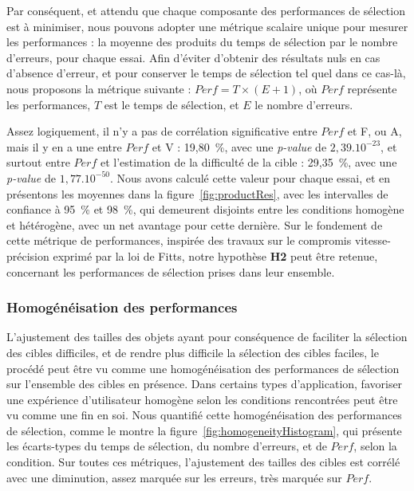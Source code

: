 	Par conséquent, et attendu que chaque composante des performances de sélection est à minimiser, nous pouvons adopter une métrique scalaire unique pour mesurer les performances : la moyenne des produits du temps de sélection par le nombre d'erreurs, pour chaque essai. Afin d'éviter d'obtenir des résultats nuls en cas d'absence d'erreur, et pour conserver le temps de sélection tel quel dans ce cas-là, nous proposons la métrique suivante : $Perf = T \times{} (E+1)$, où $Perf$ représente les performances, $T$ est le temps de sélection, et $E$ le nombre d'erreurs.
	
	Assez logiquement, il n'y a pas de corrélation significative entre $Perf$ et F, ou A, mais il y en a une entre $Perf$ et V : 19,80~\%{}, avec une \emph{p-value} de $2,39.10^{-23}$, et surtout entre $Perf$ et l'estimation de la difficulté de la cible : 29,35~\%{}, avec une \emph{p-value} de $1,77.10^{-50}$. Nous avons calculé cette valeur pour chaque essai, et en présentons les moyennes dans la figure~\ref{fig:productRes}, avec les intervalles de confiance à 95~\%{} et 98~\%{}, qui demeurent disjoints entre les conditions homogène et hétérogène, avec un net avantage pour cette dernière. Sur le fondement de cette métrique de performances, inspirée des travaux sur le compromis vitesse-précision exprimé par la loi de Fitts, notre hypothèse \textbf{H2} peut être retenue, concernant les performances de sélection prises dans leur ensemble.
	
	\subsubsection{Homogénéisation des performances}
	L'ajustement des tailles des objets ayant pour conséquence de faciliter la sélection des cibles difficiles, et de rendre plus difficile la sélection des cibles faciles, le procédé peut être vu comme une homogénéisation des performances de sélection sur l'ensemble des cibles en présence. Dans certains types d'application, favoriser une expérience d'utilisateur homogène selon les conditions rencontrées peut être vu comme une fin en soi. Nous quantifié cette homogénéisation des performances de sélection, comme le montre la figure~\ref{fig:homogeneityHistogram}, qui présente les écarts-types du temps de sélection, du nombre d'erreurs, et de $Perf$, selon la condition. Sur toutes ces métriques, l'ajustement des tailles des cibles est corrélé avec une diminution, assez marquée sur les erreurs, très marquée sur $Perf$.

